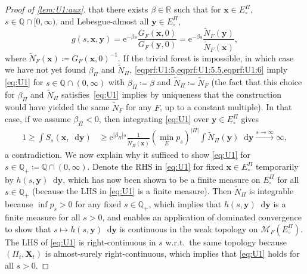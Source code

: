 \documentclass[reqno,draft]{amsart}
\numberwithin{equation}{section}
\theoremstyle{plain}
\theoremstyle{remark}
\newcommand{\R}{\mathbb{R}} %
\newcommand{\Q}{\mathbb{Q}} %
\newcommand*\diff{\mathop{}\!\mathrm{d}}
\newcommand{\tendsto}[1]{\stackrel{#1}{\longrightarrow}}
\newcommand{\e}{\mathrm{e}}
\newcommand{\fpart}{\Pi} %
\newcommand{\semi}{S}
\newcommand{\nn}{\widetilde{N}} %
\newcommand{\la}{\beta} %
\begin{document}
\begin{proof}[Proof of \cref{lem:U1:aux}]
    that there exists $\la \in \R$ such that for $\boldsymbol x\in E^\fpart_\circ $, $s\in \Q \cap [0,\infty)$, and Lebesgue-almost all $\boldsymbol y\in E^\fpart_\circ $,
    \begin{equation}\label{eqprf:U1:6}
        g(s,\boldsymbol x,\boldsymbol y) = \e^{-\la s} \frac{G_F(\boldsymbol x,0)}{G_F(\boldsymbol y,0)} = \e^{-\la s} \frac{\nn_F(\boldsymbol y)}{\nn_F(\boldsymbol x)},
    \end{equation}
    where $\nn_F(\boldsymbol x) \coloneqq  G_F(\boldsymbol x,0)^{-1}$.
    If the trivial forest is impossible, in which case we have not yet found $\la_\fpart$ and $\nn_\fpart$, \cref{eqprf:U1:5,eqprf:U1:5.5,eqprf:U1:6} imply \cref{eq:U1} for $s\in \Q \cap (0,\infty)$ with $\la_\fpart \coloneqq \la$ and $\nn_\fpart \coloneqq \nn_F$ (the fact that this choice for $\la_\fpart$ and $\nn_\fpart$ satisfies~\eqref{eq:U1} implies by uniqueness that the construction would have yielded the same $\nn_F$ for any $F$, up to a constant multiple). In that case, if we assume $\la_\fpart < 0$, then integrating \cref{eq:U1} over $\boldsymbol y\in E^\fpart_\circ $ gives
    \begin{align*}
        1 \ge \int \semi_s(\boldsymbol x,\diff \boldsymbol y)
         &\ge \e^{|\la_\fpart| s} \frac{1}{\nn_\fpart(\boldsymbol x)} (\min_E p_s)^{|\fpart|}\int \nn_\fpart(\boldsymbol y) \diff \boldsymbol y \tendsto{s\to \infty} \infty,
    \end{align*}
    a contradiction.
    We now explain why it sufficed to show \cref{eq:U1} for $s \in \Q_+ \coloneqq \Q\cap (0,\infty)$. Denote the RHS in \cref{eq:U1} for fixed $\boldsymbol x\in E^\fpart_\circ $ temporarily by $h(s,\boldsymbol y)\diff \boldsymbol y$, which has now been shown to be a finite measure on $E^\fpart_\circ $ for all $s\in \Q_+$ (because the LHS in \cref{eq:U1} is a finite measure). Then $\nn_\fpart$ is integrable because $\inf p_s > 0$ for any fixed $s\in \Q_+$, which implies that $h(s,\boldsymbol y)\diff \boldsymbol y$ is a finite measure for all $s > 0$, and enables an application of dominated convergence to show that $s\mapsto h(s,\boldsymbol y)\diff \boldsymbol y$ is continuous in the weak topology on $\mathcal{M}_F(E^\fpart_\circ )$. %
    The LHS of \cref{eq:U1} is right-continuous in $s$ w.r.t.\ the same topology because $(\fpart_t,\boldsymbol X_t)$ is almost-surely right-continuous, which implies that \cref{eq:U1} holds for all $s > 0$.


\end{proof}
\end{document}
